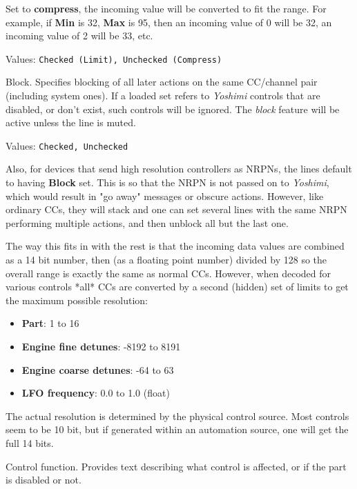    Set to \textbf{compress}, the incoming value will be converted to fit
   the range. For example, if \textbf{Min} is 32, \textbf{Max} is 95, then
   an incoming value of 0 will be 32, an incoming value of 2
   will be 33, etc.

   Values: \texttt{Checked (Limit), Unchecked (Compress)}

   Block.
   Specifies blocking of all later actions on the same CC/channel pair
   (including system ones).
   If a loaded set refers to \textsl{Yoshimi} controls that are disabled, or
   don't exist, such controls will be ignored.
   The \textsl{block} feature will be active unless the line is muted.

   Values: \texttt{Checked, Unchecked}

   Also, for devices that send high resolution controllers as NRPNs, the lines default to having \textbf{Block} set. This is so that the NRPN is not passed
   on to \textsl{Yoshimi}, which would result in "go away" messages or obscure
   actions. However, like ordinary CCs, they will stack and one can set several
   lines with the same NRPN performing multiple actions, and then unblock all
   but the last one.

   The way this fits in with the rest is that the incoming data values are
   combined as a 14 bit number, then (as a floating point number) divided by
   128 so the overall range is exactly the same as normal CCs.  However, when
   decoded for various controls *all* CCs are converted by a second (hidden)
   set of limits to get the maximum possible resolution:

   \begin{itemize}
      \item \textbf{Part}: 1 to 16
      \item \textbf{Engine fine detunes}: -8192 to 8191
      \item \textbf{Engine coarse detunes}: -64 to 63
      \item \textbf{LFO frequency}: 0.0 to 1.0 (float)
   \end{itemize}

   The actual resolution is determined by the physical control
   source. Most controls seem to be 10 bit, but if generated within an
   automation source, one will get the full 14 bits.

   Control function.
   Provides text describing what control is affected, or if the
   part is disabled or not.

